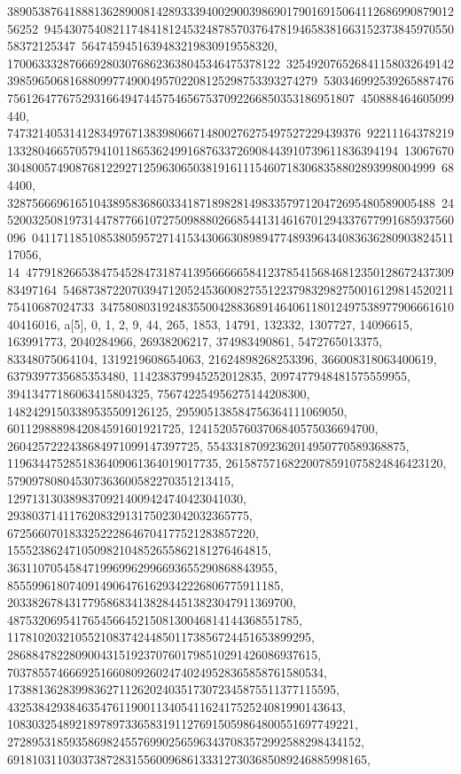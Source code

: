 {{{38905387641888136289008142893339400290039869017901691506411268699087901256252\
94543075408211748418124532487857037647819465838166315237384597055058372125347\
5647459451639483219830919558320, 17006333287666928030768623638045346475378122\
32549207652684115803264914239859650681688099774900495702208125298753393274279\
53034699253926588747675612647767529316649474457546567537092266850353186951807\
450888464605099440, 747321405314128349767138398066714800276275497527229439376\
92211164378219133280466570579410118653624991687633726908443910739611836394194\
13067670304800574908768122927125963065038191611154607183068358802893998004999\
684400, 328756669616510438958368603341871898281498335797120472695480589005488\
24520032508197314478776610727509888026685441314616701294337677991685937560096\
0411711851085380595727141534306630898947748939643408363628090382451117056, 14\
47791826653847545284731874139566666584123785415684681235012867243730983497164\
54687387220703947120524536008275512237983298275001612981452021175410687024733\
34758080319248355004288368914640611801249753897790666161040416016}}, 
 {a[5], {0, 1, 2, 9, 44, 265, 1853, 14791, 132332, 1307727, 14096615, 
   163991773, 2040284966, 26938206217, 374983490861, 5472765013375, 
   83348075064104, 1319219608654063, 21624898268253396, 366008318063400619, 
   6379397735685353480, 114238379945252012835, 2097477948481575559955, 
   39413477186063415804325, 756742254956275144208300, 
   14824291503389535509126125, 295905138584756364111069050, 
   6011298889842084591601921725, 124152057603706840575036694700, 
   2604257222438684971099147397725, 55433187092362014950770589368875, 
   1196344752851836409061364019017735, 26158757168220078591075824846423120, 
   579097808045307363600582270351213415, 
   12971313038983709214009424740423041030, 
   293803714117620832913175023042032365775, 
   6725660701833252228646704177521283857220, 
   155523862471050982104852655862181276464815, 
   3631107054584719969962996693655290868843955, 
   85559961807409149064761629342226806775911185, 
   2033826784317795868341382844513823047911369700, 
   48753206954176545664521508130046814144368551785, 
   1178102032105521083742448501173856724451653899295, 
   28688478228090043151923707601798510291426086937615, 
   703785574666925166080926024740249528365858761580534, 
   17388136283998362711262024035173072345875511377115595, 
   432538429384635476119001134054116241752524081990143643, 
   10830325489218978973365831911276915059864800551697749221, 
   272895318593586982455769902565963437083572992588298434152, 
   6918103110303738728315560096861333127303685089246885998165, 
}}}
